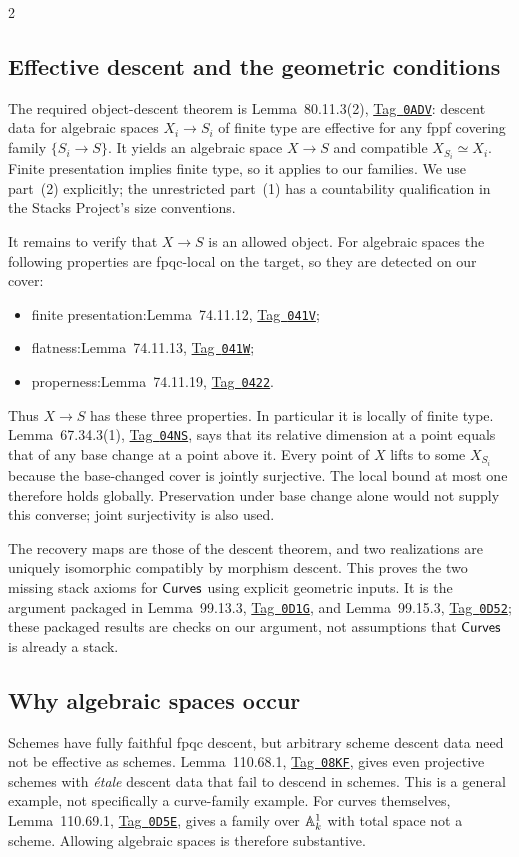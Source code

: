 \documentclass[12pt]{memoir}
\newcommand{\BGtag}[1]{\href{https://stacks.math.columbia.edu/tag/#1}{Tag~\texttt{#1}}}
\begin{document}
\begin{multicols}{2}
\subsection{Effective descent and the geometric conditions}
The required object-descent theorem is Lemma~80.11.3(2),
\BGtag{0ADV}: descent data for algebraic spaces $X_i\to S_i$ of finite
type are effective for any fppf covering family $\{S_i\to S\}$.
It yields an algebraic space $X\to S$ and compatible
$X_{S_i}\simeq X_i$. Finite presentation implies finite type, so it
applies to our families. We use part~(2) explicitly; the unrestricted
part~(1) has a countability qualification in the Stacks Project's size
conventions.

It remains to verify that $X\to S$ is an allowed object. For algebraic
spaces the following properties are fpqc-local on the target, so they
are detected on our cover:
\begin{itemize}
\item finite presentation:\newline Lemma~74.11.12, \BGtag{041V};
\item flatness:\newline Lemma~74.11.13, \BGtag{041W};
\item properness:\newline Lemma~74.11.19, \BGtag{0422}.
\end{itemize}
Thus $X\to S$ has these three properties. In particular it is locally
of finite type. Lemma~67.34.3(1), \BGtag{04NS}, says that its relative
dimension at a point equals that of any base change at a point above it.
Every point of $X$ lifts to some $X_{S_i}$ because the base-changed
cover is jointly surjective. The local bound at most one therefore
holds globally. Preservation under base change alone would not supply
this converse; joint surjectivity is also used.

The recovery maps are those of the descent theorem, and two realizations
are uniquely isomorphic compatibly by morphism descent. This proves the
two missing stack axioms for $\mathsf{Curves}$ using explicit geometric inputs.
It is the argument packaged in Lemma~99.13.3, \BGtag{0D1G}, and
Lemma~99.15.3, \BGtag{0D52}; these packaged results are checks on our
argument, not assumptions that $\mathsf{Curves}$ is already a stack.

\subsection{Why algebraic spaces occur}
Schemes have fully faithful fpqc descent, but arbitrary scheme descent
data need not be effective as schemes. Lemma~110.68.1, \BGtag{08KF},
gives even projective schemes with \emph{\'etale} descent data that fail
to descend in schemes. This is a general example, not specifically a
curve-family example. For curves themselves, Lemma~110.69.1,
\BGtag{0D5E}, gives a family over $\mathbb{A}^1_k$ with total space not a scheme.
Allowing algebraic spaces is therefore substantive.


\end{multicols}
\end{document}
